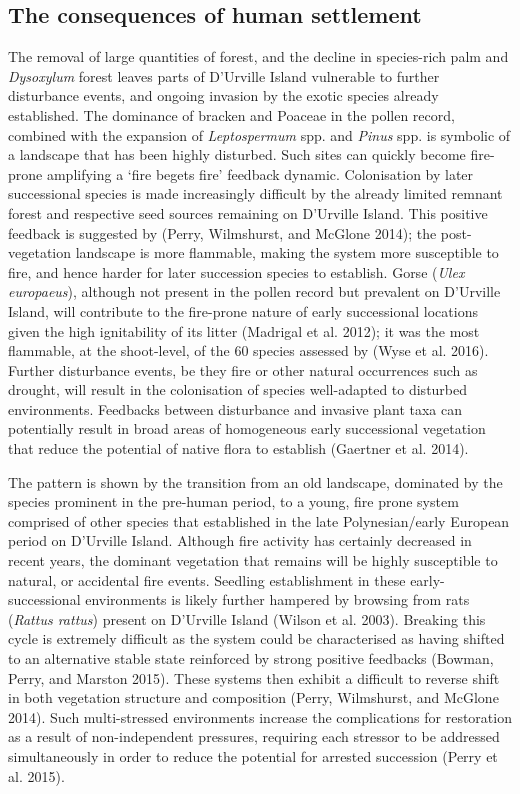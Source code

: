 \subsection{The consequences of human
settlement}\label{the-consequences-of-human-settlement}

The removal of large quantities of forest, and the decline in
species-rich palm and \emph{Dysoxylum} forest leaves parts of D'Urville
Island vulnerable to further disturbance events, and ongoing invasion by
the exotic species already established. The dominance of bracken and
Poaceae in the pollen record, combined with the expansion of
\emph{Leptospermum} spp. and \emph{Pinus} spp. is symbolic of a
landscape that has been highly disturbed. Such sites can quickly become
fire-prone amplifying a `fire begets fire' feedback dynamic.
Colonisation by later successional species is made increasingly
difficult by the already limited remnant forest and respective seed
sources remaining on D'Urville Island. This positive feedback is
suggested by (Perry, Wilmshurst, and McGlone 2014); the post-vegetation
landscape is more flammable, making the system more susceptible to fire,
and hence harder for later succession species to establish. Gorse
(\emph{Ulex europaeus}), although not present in the pollen record but
prevalent on D'Urville Island, will contribute to the fire-prone nature
of early successional locations given the high ignitability of its
litter (Madrigal et al. 2012); it was the most flammable, at the
shoot-level, of the 60 species assessed by (Wyse et al. 2016). Further
disturbance events, be they fire or other natural occurrences such as
drought, will result in the colonisation of species well-adapted to
disturbed environments. Feedbacks between disturbance and invasive plant
taxa can potentially result in broad areas of homogeneous early
successional vegetation that reduce the potential of native flora to
establish (Gaertner et al. 2014).

The pattern is shown by the transition from an old landscape, dominated
by the species prominent in the pre-human period, to a young, fire prone
system comprised of other species that established in the late
Polynesian/early European period on D'Urville Island. Although fire
activity has certainly decreased in recent years, the dominant
vegetation that remains will be highly susceptible to natural, or
accidental fire events. Seedling establishment in these
early-successional environments is likely further hampered by browsing
from rats (\emph{Rattus rattus}) present on D'Urville Island (Wilson et
al. 2003). Breaking this cycle is extremely difficult as the system
could be characterised as having shifted to an alternative stable state
reinforced by strong positive feedbacks (Bowman, Perry, and Marston
2015). These systems then exhibit a difficult to reverse shift in both
vegetation structure and composition (Perry, Wilmshurst, and McGlone
2014). Such multi-stressed environments increase the complications for
restoration as a result of non-independent pressures, requiring each
stressor to be addressed simultaneously in order to reduce the potential
for arrested succession (Perry et al. 2015).

